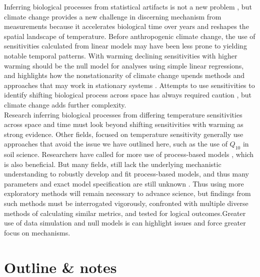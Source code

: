 \documentclass[11pt,letter]{article}
\begin{document}
Inferring biological processes from statistical artifacts is not a new problem \citep[e.g.,][]{nee2005}, but climate change provides a new challenge in discerning mechanism from measurements because it accelerates biological time over years and reshapes the spatial landscape of temperature. Before anthropogenic climate change, the use of sensitivities calculated from linear models may have been less prone to yielding notable temporal patterns. With warming declining sensitivities with higher warming should be the null model for analyses using simple linear regressions, and highlights how the nonstationarity of climate change upends methods and approaches that may work in stationary systems \citep{Milly:2008yu,tempeco}.  Attempts to use sensitivities to identify shifting biological process across space has always required caution \citep[e.g.,][]{Phillimore2012,tansey2017}, but climate change adds further complexity. \\

Research inferring biological processes from differing temperature sensitivities across space and time must look beyond shifting sensitivities with warming as strong evidence. Other fields, focused on temperature sensitivity generally use approaches that avoid the issue we have outlined here, such as the use of $Q_{10}$ in soil science. Researchers have called for more use of process-based models \citep{keenan2019}, which is also beneficial. But many fields, still lack the underlying mechanistic understanding to robustly develop and fit process-based models, and thus many parameters and exact model specification are still unknown \citep{chuine2016}. Thus using more exploratory methods will remain necessary to advance science, but findings from such methods must be interrogated vigorously, confronted with multiple diverse methods of calculating similar metrics, and tested for logical outcomes.Greater use of data simulation and null models is can highlight issues and force greater focus on mechanisms. 




\section{Outline \& notes}
\end{document}
